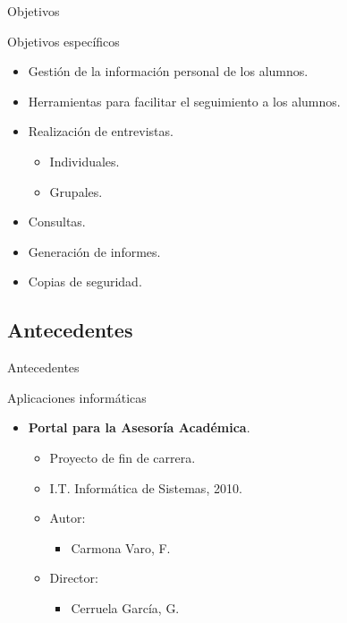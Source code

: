 \documentclass[10pt, hyperref={pdfpagelabels=false}]{beamer}
\begin{document}
      \begin{frame}{Objetivos}
        \begin{block}{Objetivos específicos}
          \begin{itemize}
           \item Gestión de la información personal de los alumnos.
           \item Herramientas para facilitar el seguimiento a los alumnos.
           \item Realización de entrevistas.
           \begin{itemize}
            \item Individuales.
            \item Grupales.
           \end{itemize}
           \item Consultas.
           \item Generación de informes.
           \item Copias de seguridad.
          \end{itemize}
        \end{block}
      \end{frame}


    \subsection{Antecedentes}
      \begin{frame}{Antecedentes}
        \begin{block}{Aplicaciones informáticas}
          \begin{itemize}
           \item \textbf{Portal para la Asesoría Académica}.
           \begin{itemize}
            \item Proyecto de fin de carrera.
            \item I.T. Informática de Sistemas, 2010.
            \item Autor:
            \begin{itemize}
              \item Carmona Varo, F.
            \end{itemize}
            \item Director:
            \begin{itemize}
              \item Cerruela García, G.
            \end{itemize}
           \end{itemize}
          \end{itemize}
        \end{block}
      \end{frame}
\end{document}
